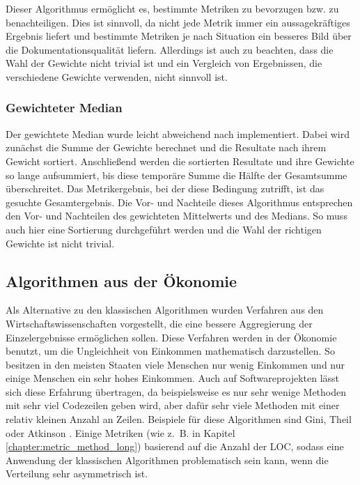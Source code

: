 Dieser Algorithmus ermöglicht es, bestimmte Metriken zu bevorzugen bzw. zu benachteiligen. Dies ist sinnvoll, da nicht jede Metrik immer ein aussagekräftiges Ergebnis liefert und bestimmte Metriken je nach Situation ein besseres Bild über die Dokumentationsqualität liefern. Allerdings ist auch zu beachten, dass die Wahl der Gewichte nicht trivial ist und ein Vergleich von Ergebnissen, die verschiedene Gewichte verwenden, nicht sinnvoll ist.

\subsubsection{Gewichteter Median}
Der gewichtete Median wurde leicht abweichend nach \cite[S. 37]{YAGER199835} implementiert. Dabei wird zunächst die Summe der Gewichte berechnet und die Resultate nach ihrem Gewicht sortiert. Anschließend werden die sortierten Resultate und ihre Gewichte so lange aufsummiert, bis diese temporäre Summe die Hälfte der Gesamtsumme überschreitet. Das Metrikergebnis, bei der diese Bedingung zutrifft, ist das gesuchte Gesamtergebnis. Die Vor- und Nachteile dieses Algorithmus entsprechen den Vor- und Nachteilen des gewichteten Mittelwerts und des Medians. So muss auch hier eine Sortierung durchgeführt werden und die Wahl der richtigen Gewichte ist nicht trivial. 

 \subsection{Algorithmen aus der Ökonomie}
 
 Als Alternative zu den klassischen Algorithmen wurden Verfahren aus den Wirtschaftswissenschaften vorgestellt, die eine bessere Aggregierung der Einzelergebnisse ermöglichen sollen. Diese Verfahren werden in der Ökonomie benutzt, um die Ungleichheit von Einkommen mathematisch darzustellen. So besitzen in den meisten Staaten viele Menschen nur wenig Einkommen und nur einige Menschen ein sehr hohes Einkommen. Auch auf Softwareprojekten lässt sich diese Erfahrung übertragen, da beispielsweise es nur sehr wenige Methoden mit sehr viel Codezeilen geben wird, aber dafür sehr viele Methoden mit einer relativ kleinen Anzahl an Zeilen. Beispiele für diese Algorithmen sind Gini, Theil oder Atkinson \cite[S. 314]{Youcantcontroltheunfamiliar:Astudyontherelationsbetweenaggregationtechniquesforsoftwaremetrics}. Einige Metriken (wie z.~B. in Kapitel \ref{chapter:metric_method_long}) basierend auf die Anzahl der \ac{LOC}, sodass eine Anwendung der klassischen Algorithmen problematisch sein kann, wenn die Verteilung sehr asymmetrisch ist. 
 
